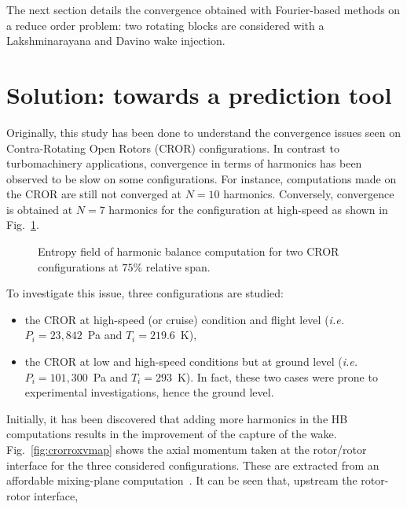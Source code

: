 The next section details the convergence obtained with Fourier-based methods
on a reduce order problem: two rotating blocks are considered with
a Lakshminarayana and Davino wake injection.

\section{Solution: towards a prediction tool}
\label{sec:CROR}

Originally, this study has been done to understand the convergence
issues seen on Contra-Rotating Open Rotors (CROR) configurations.
In contrast to turbomachinery applications, convergence
in terms of harmonics has been observed to be
slow on some configurations. For instance, computations
made on the \aipx CROR
are still not converged at $N=10$ harmonics.
Conversely, convergence is obtained at $N=7$ harmonics
for the \mockup configuration at high-speed as shown in
Fig.~\ref{fig:cptsm}.
\begin{figure}[htb]
  \centering
  \quad
  \caption{Entropy field of harmonic balance computation 
  for two CROR configurations at $75\%$ relative span.}
  \label{fig:cptsm}
\end{figure}
To investigate this issue, three configurations are studied:
\begin{itemize}
  \item the \aipx CROR 
  at high-speed (or cruise) condition
  and flight level (\emph{i.e.}  $P_i=23,842$~Pa and $T_i=219.6$~K),
  \item the \mockup CROR at low and high-speed conditions
  but at ground level (\emph{i.e.} $P_i=101,300$~Pa and
  $T_i=293$~K). In fact, these two cases were prone to 
  experimental investigations, hence the ground level.
\end{itemize}
Initially, it has been discovered that adding more harmonics in
the HB computations results in the improvement
of the capture of the wake.
Fig.~\ref{fig:crorroxvmap} shows the
axial momentum taken at the rotor/rotor interface
for the three considered configurations. These are extracted
from an affordable mixing-plane computation~\cite{Denton1979}.
It can be seen that, upstream the rotor-rotor interface,
